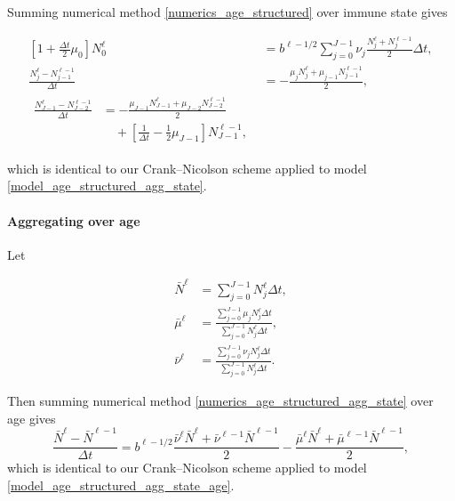 \documentclass{jpmarticle}
\let\subequationsorig\subequations%
\let\endsubequationsorig\endsubequations%
\renewenvironment{subequations}{
  \subequationsorig
  \renewcommand{\theequation}{\theparentequation.\arabic{equation}}
}{
  \endsubequationsorig
}
\begin{document}
Summing numerical method \eqref{numerics_age_structured} over immune
state gives
\begin{subequations}
  \label{numerics_age_structured_agg_state}
  \begin{align}
    \left[1 + \frac{\Delta t}{2} \mu_0\right] N_0^{\ell}
    &= b^{\ell - 1 / 2}
    \sum_{j = 0}^{J - 1} \nu_j \frac{N_j^{\ell} + N_j^{\ell - 1}}{2} \Delta t,
    \\
    \frac{N_j^{\ell} - N_{j - 1}^{\ell - 1}}{\Delta t}
    &= - \frac{\mu_j N_j^{\ell} + \mu_{j - 1} N_{j - 1}^{\ell - 1}}{2},
    \\
    \begin{split}
      \frac{N_{J - 1}^{\ell} - N_{J - 2}^{\ell - 1}}{\Delta t}
      &= - \frac{\mu_{J - 1} N_{J - 1}^{\ell} + \mu_{J - 2} N_{J - 2}^{\ell - 1}}{2}
      \\ & \quad {}
      + \left[\frac{1}{\Delta t} - \frac{1}{2} \mu_{J - 1}\right]
      N_{J - 1}^{\ell - 1},
    \end{split}
  \end{align}
\end{subequations}
which is identical to our Crank--Nicolson scheme applied to model
\eqref{model_age_structured_agg_state}.


\paragraph{Aggregating over age}

Let
\begin{subequations}
  \begin{align}
    \bar{N}^{\ell}
    &= \sum_{j = 0}^{J - 1} N_j^{\ell} \Delta t,
    \\
    \bar{\mu}^{\ell}
    &= \frac{\sum_{j = 0}^{J - 1} \mu_j N_j^{\ell} \Delta t}
    {\sum_{j = 0}^{J - 1} N_j^{\ell} \Delta t},
    \\
    \bar{\nu}^{\ell}
    &= \frac{\sum_{j = 0}^{J - 1} \nu_j N_j^{\ell} \Delta t}
    {\sum_{j = 0}^{J - 1} N_j^{\ell} \Delta t}.
  \end{align}
\end{subequations}
Then summing numerical method
\eqref{numerics_age_structured_agg_state} over age gives
\begin{equation}
  \label{numerics_age_structured_agg_state_age}
  \frac{\bar{N}^{\ell} - \bar{N}^{\ell - 1}}{\Delta t}
  = b^{\ell - 1 / 2}
  \frac{\bar{\nu}^{\ell} \bar{N}^{\ell}
    + \bar{\nu}^{\ell - 1} \bar{N}^{\ell - 1}}{2}
  - \frac{\bar{\mu}^{\ell} \bar{N}^{\ell}
    + \bar{\mu}^{\ell - 1} \bar{N}^{\ell - 1}}{2},
\end{equation}
which is identical to our Crank--Nicolson scheme applied to model
\eqref{model_age_structured_agg_state_age}.
\end{document}
